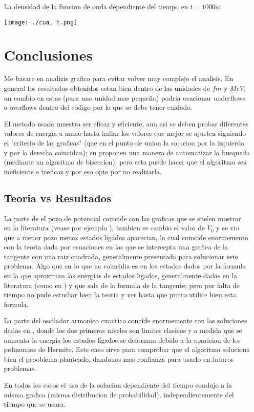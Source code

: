 \documentclass[a4paper, twocolumn, 10pt]{article}
\begin{document}
    La densidad de la funcion de onda dependiente del tiempo en $t=1000s$:
    
    \texttt{[image: ./cua, t.png]}
        
\section{Conclusiones}

     Me basare en analizis grafico para evitar volver muy complejo el analisis. En general los resultados obtenidos estan bien dentro de las unidades de $fm$ y $MeV$, un cambio en estas (para una unidad mas pequeña) podria ocacionar underflows o overflows dentro del codigo por lo que se debe tener cuidado.
     
     El metodo usado muestra ser eficaz y eficiente, aun asi se deben probar diferentes valores de energia a mano hasta hallar los valores que mejor se ajusten siguiendo el "criterio de las graficas" (que en el punto de union la solucion por la izquierda y por la derecha coincidan); en\cite{computational-landau} proponen una manera de automatizar la busqueda (mediante un algoritmo de biseccion), pero esta puede hacer que el algoritmo sea ineficiente e ineficaz y por eso opte por no realizarla.
     
     
\subsection{Teoria vs Resultados}
     La parte de el pozo de potencial coincide con las graficas que se suelen mostrar en la literatura (vease por ejemplo \cite{hyper2}), tambien se cambio el valor de $V_{0}$ y se vio que a menor pozo menos estados ligados aparecian, lo cual coincide enormemento con la teoria dada por ecuaciones en las que se intercepta una grafica de la tangente con una raiz cuadrada, generalmente presentada para solucionar este problema. Algo que en lo que no coincidia es en los estados dados por la formula en la que aproximan las energias de estados ligados, generalmente dadas en la literatura (como en \cite{quantum-cohen}) y que sale de la formula de la tangente; pero por falta de tiempo no pude estudiar bien la teoria y ver hasta que punto utilice bien esta formula.
     
    La parte del oscilador armonico cuantico concide enormemente con las soluciones dadas en \cite{hyper1}, donde los dos primeros niveles son limites clasicos y a medida que se aumenta la energia los estados ligados se deforman debido a la aparicion de los polinomios de Hermite. Este caso sirve para comprobar que el algoritmo soluciona bien el prooblema planteado, dandonos mas confianza para usarlo en futuros problemas.
    
    En todos los casos el uso de la solucion dependiente del tiempo condujo a la misma grafica (misma distribucion de probabilidad), independientemente del tiempo que se usara.
 

\end{document}
